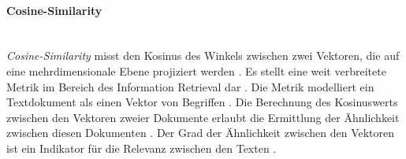 \paragraph{Cosine-Similarity}\mbox{}\\
\emph{Cosine-Similarity} misst den Kosinus des Winkels zwischen zwei Vektoren, die auf eine mehrdimensionale Ebene projiziert werden \cite{sitikhu2019comparison}. Es stellt eine weit verbreitete Metrik im Bereich des Information Retrieval dar \cite{rahutomo2012semantic}. Die Metrik modelliert ein Textdokument als einen Vektor von Begriffen \cite{rahutomo2012semantic}. Die Berechnung des Kosinuswerts zwischen den Vektoren zweier Dokumente erlaubt die Ermittlung der Ähnlichkeit zwischen diesen Dokumenten \cite{rahutomo2012semantic}. Der Grad der Ähnlichkeit zwischen den Vektoren ist ein Indikator für die Relevanz zwischen den Texten \cite{rahutomo2012semantic}.
